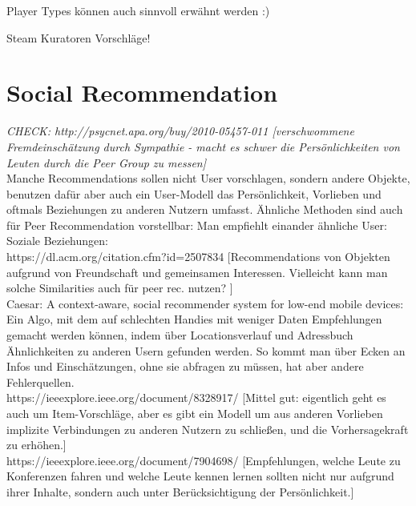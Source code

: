 \documentclass[nochapterpage,bigchapter,linedtoc,longdoc,colorback,accentcolor=tud3b]{tudreport}
\begin{document}
Player Types können auch sinnvoll erwähnt werden :)

Steam Kuratoren Vorschläge! 

\section{Social Recommendation}

\textit{CHECK: http://psycnet.apa.org/buy/2010-05457-011 [verschwommene Fremdeinschätzung durch Sympathie - macht es schwer die Persönlichkeiten von Leuten durch die Peer Group zu messen] \cite{leising2010letter}}\\

Manche Recommendations sollen nicht User vorschlagen, sondern andere Objekte, benutzen dafür aber auch ein User-Modell das Persönlichkeit, Vorlieben und oftmals Beziehungen zu anderen Nutzern umfasst. Ähnliche Methoden sind auch für Peer Recommendation vorstellbar: Man empfiehlt einander ähnliche User: \\

Soziale Beziehungen:\\

https://dl.acm.org/citation.cfm?id=2507834 [Recommendations von Objekten aufgrund von Freundschaft und gemeinsamen Interessen. Vielleicht kann man solche Similarities auch für peer rec. nutzen? ] \cite{feng2013recommendation}\\

Caesar: A context-aware, social recommender system for low-end mobile devices: Ein Algo, mit dem auf schlechten Handies mit weniger Daten Empfehlungen gemacht werden können, indem über Locationsverlauf und Adressbuch Ähnlichkeiten zu anderen Usern gefunden werden. So kommt man über Ecken an Infos und Einschätzungen, ohne sie abfragen zu müssen, hat aber andere Fehlerquellen. \cite{ramaswamy2009caesar}\\

https://ieeexplore.ieee.org/document/8328917/ [Mittel gut: eigentlich geht es auch um Item-Vorschläge, aber es gibt ein Modell um aus anderen Vorlieben implizite Verbindungen zu anderen Nutzern zu schließen, und die Vorhersagekraft zu erhöhen.] \cite{hsu2018general}\\

https://ieeexplore.ieee.org/document/7904698/  [Empfehlungen, welche Leute zu Konferenzen fahren und welche Leute kennen lernen sollten nicht nur aufgrund ihrer Inhalte, sondern auch unter Berücksichtigung der Persönlichkeit.] \cite{asabere2017improving}\\
\end{document}
